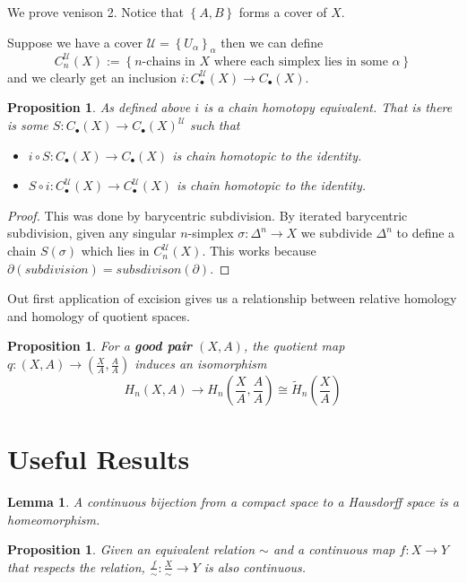 \documentclass[11pt]{article}
\newcommand{\defeq}{:=}
\newtheorem{lemma}[theorem]{Lemma}
\newtheorem{prop}[theorem]{Proposition}
\begin{document}
We prove venison 2.
Notice that $\left\{ A, B\right\}$ forms a cover of $X$.

Suppose we have a cover $\mathcal{U}=\left\{ U_\alpha\right\}_\alpha$ then we can define
\[
	C_n^\mathcal{U}(X) \defeq\left\{ n\text{-chains in }X\text{ where each simplex lies in some }\alpha\right\}
\]
and we clearly get an inclusion $i: C_\bullet^\mathcal{U}(X) \to C_\bullet(X)$.

\begin{prop}
As defined above $i$ is a chain homotopy equivalent.
That is there is some $S:C_\bullet(X) \to C_\bullet(X)^\mathcal{U}$ such that
\begin{itemize}
	\item $i \circ S: C_\bullet(X) \to C_\bullet(X)$ is chain homotopic to the identity.
	\item $S \circ i: C_\bullet^\mathcal{U}(X) \to C_\bullet^\mathcal{U}(X)$ is chain homotopic to the identity.
\end{itemize}
\end{prop}

\begin{proof}
This was done by barycentric subdivision.
By iterated barycentric subdivision, given any singular $n$-simplex $\sigma:\Delta^n\to X$ we subdivide $\Delta^n$ to define a chain $S(\sigma)$ which lies in $C_n^\mathcal{U}(X)$.
This works because $\partial(subdivision) = subsdivison(\partial)$.
\end{proof}

Out first application of excision gives us a relationship between relative homology and homology of quotient spaces.

\begin{prop}
For a \textbf{good pair} $(X, A)$, the quotient map $q: (X, A) \to \left( \frac{X}{A}, \frac{A}{A}\right)$ induces an isomorphism
\[
H_n(X, A) \to H_n\left( \frac{X}{A}, \frac{A}{A}\right) \cong \widetilde{H}_n\left(\frac{X}{A}\right)
\]
\end{prop}

\section{Useful Results}
\begin{lemma}
A continuous bijection from a compact space to a Hausdorff space is a homeomorphism.
\end{lemma}


\begin{prop}
Given an equivalent relation $\sim$ and a continuous map $f:X\to Y$ that respects the relation, $\frac{f}{\sim}:\frac{X}{\sim}\to Y$ is also continuous.
\end{prop}
\end{document}
